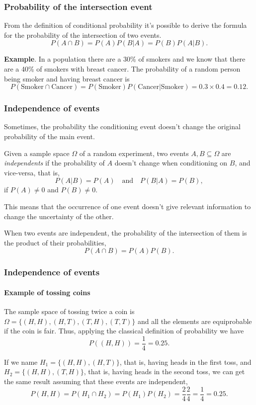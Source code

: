 \begin{frame}
\frametitle{Probability of the intersection event}
From the definition of conditional probability it's possible to derive the formula for the probability of the
intersection of two events. 
\[
P(A\cap B) = P(A)P(B|A) = P(B)P(A|B).
\]

\textbf{Example}. In a population there are a 30\% of smokers and we know that there are a 40\% of smokers with breast
cancer. 
The probability of a random person being smoker and having breast cancer is 
\[
P(\mbox{Smoker}\cap \mbox{Cancer})= P(\mbox{Smoker})P(\mbox{Cancer}|\mbox{Smoker}) =
0.3\times 0.4 = 0.12.
\]
\end{frame}


\begin{frame}
\frametitle{Independence of events}
Sometimes, the probability the conditioning event doesn't change the original probability of the main event. 
\begin{definition}
Given a sample space $\Omega$ of a random experiment, two events  $A,B\subseteq \Omega$ are \emph{independents} if the
probability of $A$ doesn't change when conditioning on $B$, and vice-versa, that is,
\[
P(A|B) = P(A) \quad \mbox{and} \quad P(B|A)=P(B),
\]
if $P(A)\neq 0$ and $P(B)\neq 0$.
\end{definition}

This means that the occurrence of one event doesn't give relevant information to change the uncertainty of the other.

When two events are independent, the probability of the intersection of them is the product of their probabilities,
\[
P(A\cap B) = P(A)P(B).
\]
\end{frame}


\begin{frame}
\frametitle{Independence of events}
\framesubtitle{Example of tossing coins}
The sample space of tossing twice a coin is $\Omega=\{(H,H),(H,T),(T,H),(T,T)\}$ and all the elements are equiprobable
if the coin is fair. 
Thus, applying the classical definition of probability we have 
\[
P((H,H)) = \frac{1}{4} = 0.25.
\]

If we name $H_1=\{(H,H),(H,T)\}$, that is, having heads in the first toss, and $H_2=\{(H,H),(T,H)\}$, that is, having
heads in the second toss, we can get the same result assuming that these events are independent,
\[
P(H,H)= P(H_1\cap H_2) = P(H_1)P(H_2) = \frac{2}{4}\frac{2}{4}=\frac{1}{4}=0.25.
\] 
\end{frame}


